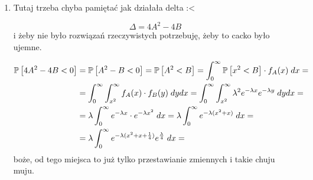 \documentclass{article}
\begin{document}
  \begin{enumerate}
    \item Tutaj trzeba chyba pamiętać jak działała delta :<

      $$\Delta=4A^2-4B$$
      i żeby nie było rozwiązań rzeczywistych potrzebuję, żeby to cacko było ujemne.

      \begin{align*}
        \prob{4A^2-4B< 0}&=\prob{A^2-B<0}=\prob{A^2<B}=\int_0^\infty\prob{x^2<B}\cdot f_A(x)\;dx=\\
                         &=\int_0^\infty\int_{x^2}^\infty f_A(x)\cdot f_B(y)\;dydx=\int_0^\infty\int_{x^2}^\infty \lambda^2 e^{-\lambda x}e^{-\lambda y}\;dydx=\\
                         &=\lambda\int_0^\infty e^{-\lambda x}\cdot e^{-\lambda x^2}\;dx=\lambda\int_0^\infty e^{-\lambda(x^2+x)}\;dx=\\
                         &=\lambda\int_0^\infty e^{-\lambda(x^2+x+\frac{1}{4})}e^{\frac{\lambda}{4}}\;dx=
      \end{align*}
      boże, od tego miejsca to już tylko przestawianie zmiennych i takie chuju muju.
\end{enumerate}
\end{document}
